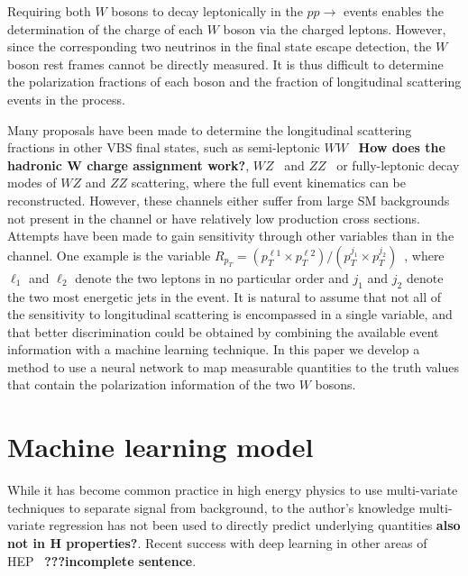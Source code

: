 Requiring both $W$ bosons to decay leptonically in the $pp
\to$ \ssWW events enables the determination of the charge of
each $W$ boson via the charged leptons. However, since the
corresponding two neutrinos in the final state escape detection, the
$W$ boson rest frames cannot be directly measured.  It is thus
difficult to determine the polarization fractions of each boson and
the fraction of longitudinal scattering events in the \ssWW process.

Many proposals have been made to determine the longitudinal scattering
fractions in other VBS final states, such as semi-leptonic
$WW$~\cite{Han:2009em} {\bf How does the hadronic W charge assignment
  work?}, $WZ$~\cite{aa} and $ZZ$~\cite{le houche report} or
fully-leptonic decay modes of $WZ$ and $ZZ$ scattering, where the full
event kinematics can be reconstructed. However, these channels either
suffer from large SM backgrounds not present in the \ssWW channel or
have relatively low production cross sections. Attempts have been made
to gain sensitivity through other variables than \ts in the \ssWW
channel. One example is the variable $R_{p_T}=(p_{T}^{\ell 1} \times
p_{T}^{\ell 2}) / (p_T^{j_1} \times p_T^{j_2})$~\cite{Doroba:2012pd},
where $\ell_1$ and $\ell_2$ denote the two leptons in no particular
order and $j_1$ and $j_2$ denote the two most energetic jets in the
event.  It is natural to assume that not all of the sensitivity to
longitudinal scattering is encompassed in a single variable, and that
better discrimination could be obtained by combining the available
event information with a machine learning technique. In this paper we
develop a method to use a neural network to map measurable quantities
to the truth \cts values that contain the polarization information of
the two $W$ bosons.

\section{Machine learning model}
While it has become common practice in high energy physics to use
multi-variate techniques to separate signal from background, to the
author's knowledge multi-variate regression has not been used to
directly predict underlying quantities {\bf also not in H
  properties?}.  Recent success with deep learning in other areas of
HEP~\cite{Baldi:2014pta,Baldi:2014pta} {\bf ???incomplete sentence}.

